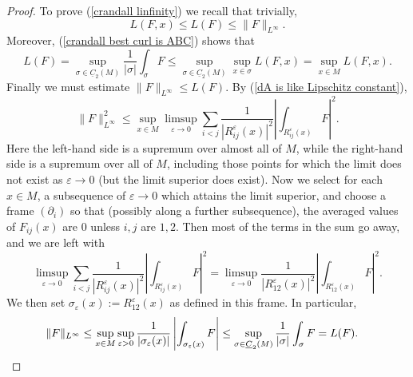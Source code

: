 \documentclass[reqno,11pt]{amsart}
\newcommand{\Chain}{\underline C}
\theoremstyle{definition}
\numberwithin{equation}{section}
\begin{document}
\begin{proof}
To prove (\ref{crandall linfinity}) we recall that trivially,
$$L(F, x) \leq L(F) \leq \|F\|_{L^\infty}.$$
Moreover, (\ref{crandall best curl is ABC}) shows that
$$L(F) = \sup_{\sigma \in \Chain_2(M)} \frac{1}{|\sigma|} \int_\sigma F \leq \sup_{\sigma \in \Chain_2(M)} \sup_{x \in \sigma} L(F, x) = \sup_{x \in M} L(F, x).$$
Finally we must estimate $\|F\|_{L^\infty} \leq L(F)$.
By (\ref{dA is like Lipschitz constant}),
$$\|F\|_{L^\infty}^2 \leq \sup_{x \in M} \limsup_{\varepsilon \to 0} \sum_{i < j} \frac{1}{|R^\varepsilon_{ij}(x)|^2} \left|\int_{R^\varepsilon_{ij}(x)} F\right|^2.$$
Here the left-hand side is a supremum over almost all of $M$, while the right-hand side is a supremum over all of $M$, including those points for which the limit does not exist as $\varepsilon \to 0$ (but the limit superior does exist).
Now we select for each $x \in M$, a subsequence of $\varepsilon \to 0$ which attains the limit superior, and choose a frame $(\partial_i)$ so that (possibly along a further subsequence), the averaged values of $F_{ij}(x)$ are $0$ unless $i,j$ are $1,2$.
Then most of the terms in the sum go away, and we are left with 
$$\limsup_{\varepsilon \to 0} \sum_{i < j} \frac{1}{|R^\varepsilon_{ij}(x)|^2} \left|\int_{R^\varepsilon_{ij}(x)} F\right|^2 = \limsup_{\varepsilon \to 0} \frac{1}{|R^\varepsilon_{12}(x)|^2} \left|\int_{R^\varepsilon_{12}(x)} F\right|^2.$$
We then set $\sigma_\varepsilon(x) := R^\varepsilon_{12}(x)$ as defined in this frame.
In particular, 
\begin{align*}
	\|F\|_{L^\infty} &\leq \sup_{x \in M} \sup_{\varepsilon > 0} \frac{1}{|\sigma_\varepsilon(x)|} \left|\int_{\sigma_\varepsilon(x)} F\right| \leq \sup_{\sigma \in \Chain_2(M)} \frac{1}{|\sigma|} \int_\sigma F = L(F). \qedhere 
\end{align*}
\end{proof}

\end{document}

